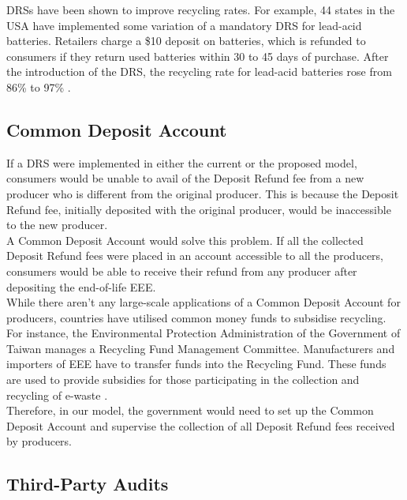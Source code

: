 \documentclass[a4paper, 12pt]{article}
\begin{document}
                    DRSs have been shown to improve recycling rates. For example, 44 states in the USA have implemented some variation of a mandatory DRS for lead-acid batteries. Retailers charge a \$10 deposit on batteries, which is refunded to consumers if they return used batteries within 30 to 45 days of purchase. After the introduction of the DRS, the recycling rate for lead-acid batteries rose from 86\% to 97\% \parencite{wallspaper}.
                    
                    \subsection{Common Deposit Account}
                    
                    If a DRS were implemented in either the current or the proposed model, consumers would be unable to avail of the Deposit Refund fee from a new producer who is different from the original producer. This is because the Deposit Refund fee, initially deposited with the original producer, would be inaccessible to the new producer.\\
                    
                    A Common Deposit Account would solve this problem. If all the collected Deposit Refund fees were placed in an account accessible to all the producers, consumers would be able to receive their refund from any producer after depositing the end-of-life EEE.\\
                    
                    While there aren’t any large-scale applications of a Common Deposit Account for producers, countries have utilised common money funds to subsidise recycling. For instance, the Environmental Protection Administration of the Government of Taiwan manages a Recycling Fund Management Committee. Manufacturers and importers of EEE have to transfer funds into the Recycling Fund. These funds are used to provide subsidies for those participating in the collection and recycling of e-waste \parencite{chungchapter}.\\
                    
                    Therefore, in our model, the government would need to set up the Common Deposit Account and supervise the collection of all Deposit Refund fees received by producers.
                    
                    \subsection{Third-Party Audits}
                    
\end{document}
